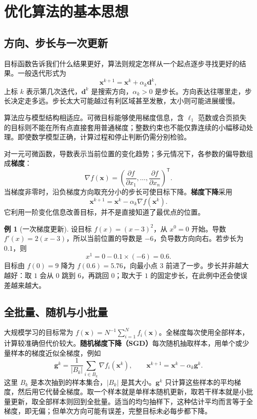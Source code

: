 \documentclass[UTF8,fontset=fandol,a4paper,12pt]{ctexart}
\newcommand{\vx}{\boldsymbol x}
\theoremstyle{definition}
\newtheorem{example}[definition]{例}
\begin{document}
\section{优化算法的基本思想}\label{sec:algorithms}
\subsection{方向、步长与一次更新}
目标函数告诉我们什么结果更好，算法则规定怎样从一个起点逐步寻找更好的结果。一般迭代形式为
\[
 \vx^{k+1}=\vx^k+\alpha_k\boldsymbol d^k,
\]
上标 $k$ 表示第几次迭代，$\boldsymbol d^k$ 是搜索方向，$\alpha_k>0$ 是步长。方向表达往哪里走，步长决定走多远。步长太大可能越过有利区域甚至发散，太小则可能进展缓慢。

算法应与模型结构相适应。可微目标能够使用梯度信息，含 $\ell_1$ 范数或合页损失的目标则不能在所有点直接套用普通梯度；整数约束也不能仅靠连续的小幅移动处理。即使数学模型正确，计算过程和停止判断仍需分别检验。

对一元可微函数，导数表示当前位置的变化趋势；多元情况下，各参数的偏导数组成\textbf{梯度}：
\[
 \nabla f(\vx)=\left(\frac{\partial f}{\partial x_1},\ldots,
 \frac{\partial f}{\partial x_n}\right)^{\mathsf T}.
\]
当梯度非零时，沿负梯度方向取充分小的步长可使目标下降。\textbf{梯度下降}采用
\[
 \boxed{\vx^{k+1}=\vx^k-\alpha_k\nabla f(\vx^k).}
\]
它利用一阶变化信息改善目标，并不是直接知道了最优点的位置。

\begin{example}[一次梯度更新]
设目标 $f(x)=(x-3)^2$，从 $x^0=0$ 开始。导数 $f'(x)=2(x-3)$，所以当前位置的导数是 $-6$，负导数方向向右。若步长为 $0.1$，则
\[
 x^1=0-0.1\times(-6)=0.6.
\]
目标由 $f(0)=9$ 降为 $f(0.6)=5.76$，向最小点 $3$ 前进了一步。步长并非越大越好：取 $1$ 会从 $0$ 跳到 $6$，再跳回 $0$；取大于 $1$ 的固定步长，在此例中还会使误差越来越大。
\end{example}

\subsection{全批量、随机与小批量}

大规模学习的目标常为 $f(\vx)=N^{-1}\sum_{i=1}^N f_i(\vx)$。全梯度每次使用全部样本，计算较准确但代价较大。\textbf{随机梯度下降（SGD）}每次随机抽取样本，用单个或少量样本的梯度近似全梯度，例如
\[
 \boldsymbol g^k=\frac1{|B_k|}\sum_{i\in B_k}\nabla f_i(\vx^k),\qquad
 \vx^{k+1}=\vx^k-\alpha_k\boldsymbol g^k.
\]
这里 $B_k$ 是本次抽到的样本集合，$|B_k|$ 是其大小。$\boldsymbol g^k$ 只计算这些样本的平均梯度，然后用它代替全梯度。取一个样本就是单样本随机更新，取若干样本就是小批量更新，取全部样本则回到全批量。适当的均匀抽样下，这种估计平均而言等于全梯度，即无偏；但单次方向可能有误差，完整目标未必每步都下降。
\end{document}
